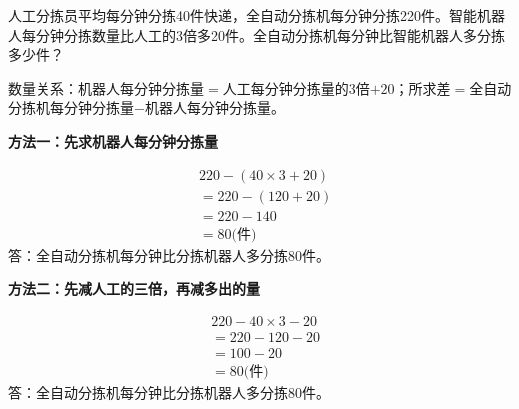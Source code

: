 人工分拣员平均每分钟分拣40件快递，全自动分拣机每分钟分拣220件。智能机器人每分钟分拣数量比人工的3倍多20件。全自动分拣机每分钟比智能机器人多分拣多少件？\par
\begin{BookAnswer}
数量关系：机器人每分钟分拣量\(=\)人工每分钟分拣量的\(3\)倍\(+20\)；所求差\(=\)全自动分拣机每分钟分拣量\(-\)机器人每分钟分拣量。\par \par\noindent\begin{minipage}{\linewidth}\textbf{方法一：先求机器人每分钟分拣量}\par \[\begin{aligned}&220-(40\times3+20)\\&=220-(120+20)\\&=220-140\\&=80\text{(件)}\end{aligned}\]答：全自动分拣机每分钟比分拣机器人多分拣\(80\)件。\end{minipage}\par \par \par\noindent\begin{minipage}{\linewidth}\textbf{方法二：先减人工的三倍，再减多出的量}\par \[\begin{aligned}&220-40\times3-20\\&=220-120-20\\&=100-20\\&=80\text{(件)}\end{aligned}\]答：全自动分拣机每分钟比分拣机器人多分拣\(80\)件。\end{minipage}\par
\end{BookAnswer}

